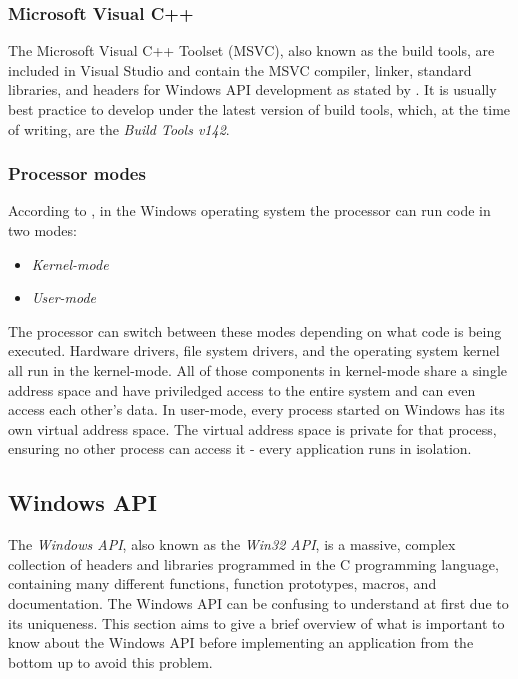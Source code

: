 \subsubsection{Microsoft Visual C++}
\label{ch2msvc}
The Microsoft Visual C++ Toolset (MSVC), also known as the build tools, are included in Visual Studio and contain the MSVC compiler, linker, standard libraries, and headers for Windows API development as stated by \cite{MsVc}. It is usually best practice to develop under the latest version of build tools, which, at the time of writing, are the \textit{Build Tools v142}.

\subsubsection{Processor modes}
According to \cite{WinProcModes}, in the Windows operating system the processor can run code in two modes:
\begin{itemize}
    \item \textit{Kernel-mode}
    \item \textit{User-mode}
\end{itemize}
The processor can switch between these modes depending on what code is being executed. Hardware drivers, file system drivers, and the operating system kernel all run in the kernel-mode. All of those components in kernel-mode share a single address space and have priviledged access to the entire system and can even access each other's data. In user-mode, every process started on Windows has its own virtual address space. The virtual address space is private for that process, ensuring no other process can access it - every application runs in isolation.

\subsection{Windows API}
The \textit{Windows API}, also known as the \textit{Win32 API}, is a massive, complex collection of headers and libraries programmed in the C programming language, containing many different functions, function prototypes, macros, and documentation. The Windows API can be confusing to understand at first due to its uniqueness. This section aims to give a brief overview of what is important to know about the Windows API before implementing an application from the bottom up to avoid this problem.

